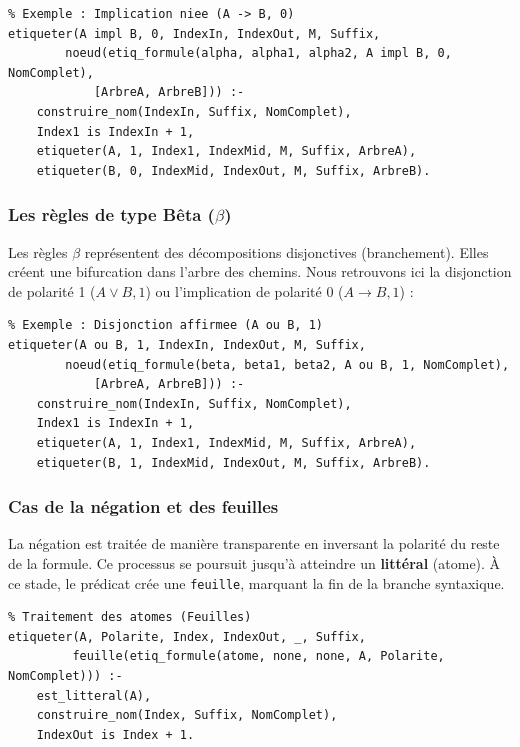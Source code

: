\documentclass[12pt, a4paper]{article}
\begin{document}
\begin{lstlisting}
% Exemple : Implication niee (A -> B, 0)
etiqueter(A impl B, 0, IndexIn, IndexOut, M, Suffix,
        noeud(etiq_formule(alpha, alpha1, alpha2, A impl B, 0, NomComplet),
            [ArbreA, ArbreB])) :-
    construire_nom(IndexIn, Suffix, NomComplet),
    Index1 is IndexIn + 1,
    etiqueter(A, 1, Index1, IndexMid, M, Suffix, ArbreA),
    etiqueter(B, 0, IndexMid, IndexOut, M, Suffix, ArbreB).
\end{lstlisting}

\subsubsection{Les règles de type Bêta ($\beta$)}

Les règles $\beta$ représentent des décompositions disjonctives (branchement). Elles créent une bifurcation dans l'arbre des chemins. Nous retrouvons ici la disjonction de polarité 1 ($A \lor B, 1$) ou l'implication de polarité 0 ($A \rightarrow B, 1$) :

\begin{lstlisting}
% Exemple : Disjonction affirmee (A ou B, 1)
etiqueter(A ou B, 1, IndexIn, IndexOut, M, Suffix,
        noeud(etiq_formule(beta, beta1, beta2, A ou B, 1, NomComplet),
            [ArbreA, ArbreB])) :-
    construire_nom(IndexIn, Suffix, NomComplet),
    Index1 is IndexIn + 1,
    etiqueter(A, 1, Index1, IndexMid, M, Suffix, ArbreA),
    etiqueter(B, 1, IndexMid, IndexOut, M, Suffix, ArbreB).
\end{lstlisting}

\subsubsection{Cas de la négation et des feuilles}

La négation est traitée de manière transparente en inversant la polarité du reste de la formule. Ce processus se poursuit jusqu'à atteindre un \textbf{littéral} (atome). À ce stade, le prédicat crée une \texttt{feuille}, marquant la fin de la branche syntaxique.

\begin{lstlisting}
% Traitement des atomes (Feuilles)
etiqueter(A, Polarite, Index, IndexOut, _, Suffix, 
         feuille(etiq_formule(atome, none, none, A, Polarite, NomComplet))) :-
    est_litteral(A),
    construire_nom(Index, Suffix, NomComplet),
    IndexOut is Index + 1.
\end{lstlisting}
\end{document}
